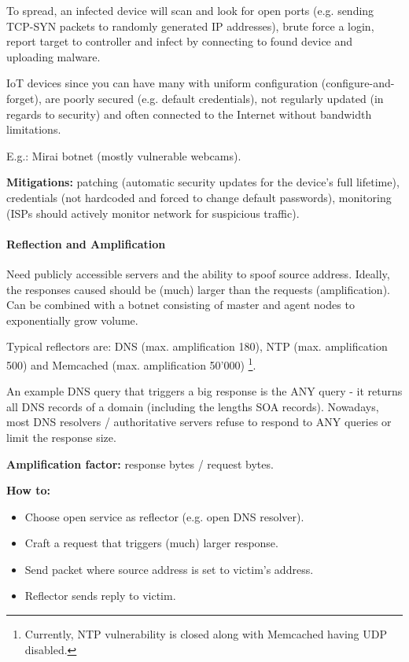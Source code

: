 To spread, an infected device will scan and look for open ports (e.g. sending TCP-SYN packets to randomly generated IP addresses), brute force a login, report target to controller and infect by connecting to found device and uploading malware.

IoT devices since you can have many with uniform configuration (configure-and-forget), are poorly secured (e.g. default credentials), not regularly updated (in regards to security) and often connected to the Internet without bandwidth limitations.

E.g.: Mirai botnet (mostly vulnerable webcams).

\textbf{Mitigations:} patching (automatic security updates for the device's full lifetime), credentials (not hardcoded and forced to change default passwords), monitoring (ISPs should actively monitor network for suspicious traffic).

\paragraph{Reflection and Amplification}
Need publicly accessible servers and the ability to spoof source address. Ideally, the responses caused should be (much) larger than the requests (amplification). Can be combined with a botnet consisting of master and agent nodes to exponentially grow volume.

Typical reflectors are: DNS (max. amplification 180), NTP (max. amplification 500) and Memcached (max. amplification 50'000) \footnote{Currently, NTP vulnerability is closed along with Memcached having UDP disabled.}.

An example DNS query that triggers a big response is the ANY query - it returns all DNS records of a domain (including the lengths SOA records). Nowadays, most DNS resolvers / authoritative servers refuse to respond to ANY queries or limit the response size.

\textbf{Amplification factor:} response bytes / request bytes. 

\textbf{How to:}
\begin{itemize}
    \item Choose open service as reflector (e.g. open DNS resolver).
    \item Craft a request that triggers (much) larger response.
    \item Send packet where source address is set to victim's address.
    \item Reflector sends reply to victim.
\end{itemize}

